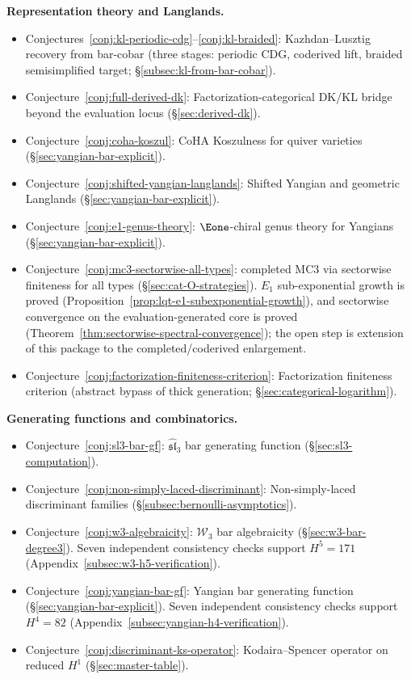 \smallskip
\noindent\textbf{Representation theory and Langlands.}

\begin{itemize}[nosep]
\item Conjectures~\ref{conj:kl-periodic-cdg}--\ref{conj:kl-braided}:
  Kazhdan--Lusztig recovery from bar-cobar (three stages:
  periodic CDG, coderived lift, braided semisimplified target;
  \S\ref{subsec:kl-from-bar-cobar}).
\item Conjecture~\ref{conj:full-derived-dk}:
  Factorization-categorical DK/KL bridge beyond the evaluation locus
  (\S\ref{sec:derived-dk}).
\item Conjecture~\ref{conj:coha-koszul}:
  CoHA Koszulness for quiver varieties
  (\S\ref{sec:yangian-bar-explicit}).
\item Conjecture~\ref{conj:shifted-yangian-langlands}:
  Shifted Yangian and geometric Langlands
  (\S\ref{sec:yangian-bar-explicit}).
\item Conjecture~\ref{conj:e1-genus-theory}:
  $\Eone$-chiral genus theory for Yangians
  (\S\ref{sec:yangian-bar-explicit}).
\item Conjecture~\ref{conj:mc3-sectorwise-all-types}:
  completed MC3 via sectorwise finiteness for all types
  (\S\ref{sec:cat-O-strategies}).  $E_1$ sub-exponential growth is
  proved
  (Proposition~\ref{prop:lqt-e1-subexponential-growth}), and
  sectorwise convergence on the evaluation-generated core is proved
  (Theorem~\ref{thm:sectorwise-spectral-convergence}); the open step
  is extension of this package to the completed/coderived
  enlargement.
\item Conjecture~\ref{conj:factorization-finiteness-criterion}:
  Factorization finiteness criterion (abstract bypass of thick
  generation; \S\ref{sec:categorical-logarithm}).
\end{itemize}

\smallskip
\noindent\textbf{Generating functions and combinatorics.}
\begin{itemize}[nosep]
\item Conjecture~\ref{conj:sl3-bar-gf}:
  $\widehat{\mathfrak{sl}}_3$ bar generating function
  (\S\ref{sec:sl3-computation}).
\item Conjecture~\ref{conj:non-simply-laced-discriminant}:
  Non-simply-laced discriminant families
  (\S\ref{subsec:bernoulli-asymptotics}).
\item Conjecture~\ref{conj:w3-algebraicity}:
  $\mathcal{W}_3$ bar algebraicity
  (\S\ref{sec:w3-bar-degree3}).
  Seven independent consistency checks support $H^5 = 171$
  (Appendix~\ref{subsec:w3-h5-verification}).
\item Conjecture~\ref{conj:yangian-bar-gf}:
  Yangian bar generating function
  (\S\ref{sec:yangian-bar-explicit}).
  Seven independent consistency checks support $H^4 = 82$
  (Appendix~\ref{subsec:yangian-h4-verification}).
\item Conjecture~\ref{conj:discriminant-ks-operator}:
  Kodaira--Spencer operator on reduced $H^1$
  (\S\ref{sec:master-table}).
\end{itemize}

